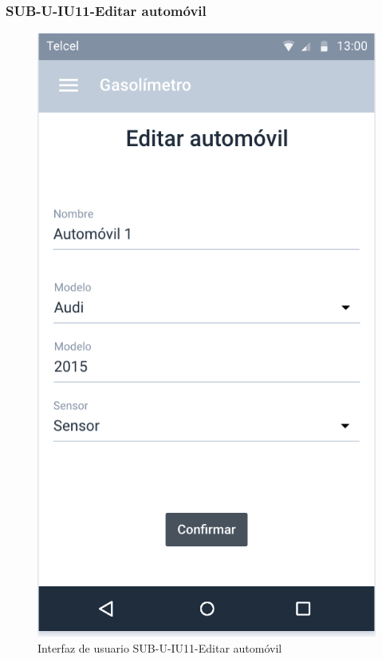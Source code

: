 \subsubsection{SUB-U-IU11-Editar automóvil}\label{SUB-U-IU11}
\begin{figure}[H]
	\centering
	\includegraphics[scale=1]{Capitulo4/software/submodulos/usuarios/images/sub-u-iu11}
	\caption{Interfaz de usuario SUB-U-IU11-Editar automóvil}
	\label{fig:sub-u-iu11}
\end{figure}